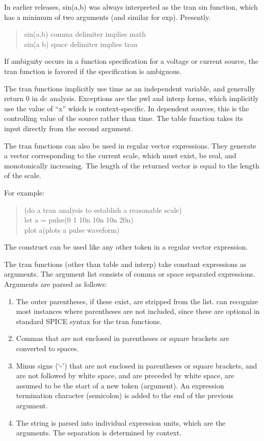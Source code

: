 In earlier {\WRspice} releases, {\vt sin(a,b)} was always interpreted
as the tran {\vt sin} function, which has a minimum of two arguments
(and similar for {\vt exp}).  Presently.
\begin{quote}
{\vt sin(a,b)}  comma delimiter implies math\\
{\vt sin(a b)}  space delimiter implies tran
\end{quote}

If ambiguity occurs in a function specification for a voltage or
current source, the tran function is favored if the specification is
ambiguous.

The tran functions implicitly use time as an independent variable, and
generally return 0 in dc analysis.  Exceptions are the {\vt pwl} and
{\vt interp} forms, which implicitly use the value of ``{\vt x}''
which is context-specific.  In dependent sources, this is the
controlling value of the source rather than time.  The {\vt table}
function takes its input directly from the second argument.

The tran functions can also be used in regular vector expressions. 
They generate a vector corresponding to the current scale, which must
exist, be real, and monotonically increasing.  The length of the
returned vector is equal to the length of the scale.
 
For example:
\begin{quote}
(do a tran analysis to establish a reasonable scale)\\
{\vt let a = pulse(0 1 10n 10n 10n 20n)}\\
{\vt plot a}\hspace{1cm}(plots a pulse waveform)\\
\end{quote}
The construct can be used like any other token in a regular vector
expression.

The tran functions (other than {\vt table} and {\vt interp}) take
constant expressions as arguments.  The argument list consists of
comma or space separated expressions.  Arguments are parsed as
follows:

\begin{enumerate}
\item{The outer parentheses, if these exist, are stripped from the list.
     {\WRspice} can recognize most instances where parentheses are not
     included, since these are optional in standard SPICE syntax for the
     tran functions.}
\item{Commas that are not enclosed in parentheses or square brackets are
     converted to spaces.}
\item{Minus signs (`{\vt -}') that are not enclosed in parentheses or square
      brackets, and are not followed by white space, and are preceded
      by white space, are assumed to be the start of a new token
      (argument).  An expression termination character (semicolon) is
      added to the end of the previous argument.}
\item{The string is parsed into individual expression units, which are
      the arguments.  The separation is determined by context.}
\end{enumerate}


